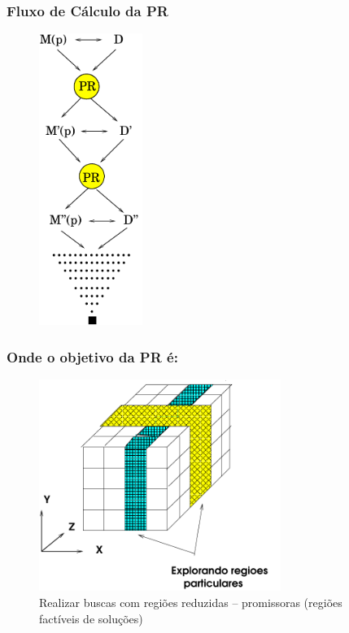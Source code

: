 \documentclass{beamer}
\begin{document}
\begin{frame}[fragile]

\frametitle{Fluxo de Cálculo da PR}

\begin{figure}[!htb]
\centering
\includegraphics[width=0.30\textwidth, height=0.75\textheight]{figures/dinamica_pr.pdf}
\end{figure}
   
\end{frame}


\begin{frame}[fragile]

\frametitle{Onde o objetivo da PR é:}

\begin{figure}[!htb]
\begin{center}
\includegraphics[width=0.70\textwidth, height=0.60\textheight]{figures/reducao_PR_01.pdf}
\caption{Realizar buscas com regiões reduzidas -- promissoras (regiões factíveis de soluções)}
\end{center}
\end{figure}
    
\end{frame}
\end{document}
